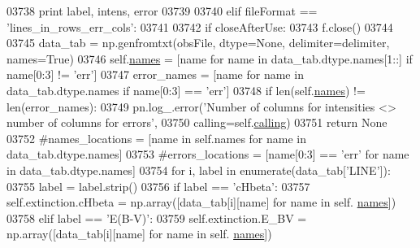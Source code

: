 \begin{DoxyCode}
03738                         \textcolor{keywordflow}{print} label, intens, error
03739                         
03740         \textcolor{keywordflow}{elif} fileFormat == \textcolor{stringliteral}{'lines\_in\_rows\_err\_cols'}:
03741             
03742             \textcolor{keywordflow}{if} closeAfterUse:
03743                 f.close()
03744                 
03745             data\_tab = np.genfromtxt(obsFile, dtype=\textcolor{keywordtype}{None}, delimiter=delimiter, names=\textcolor{keyword}{True})
03746             self.\hyperlink{classpyneb_1_1core_1_1pynebcore_1_1_observation_a3f365d0b1488b2eba300bf71caf23c17}{names} = [name \textcolor{keywordflow}{for} name \textcolor{keywordflow}{in} data\_tab.dtype.names[1::] \textcolor{keywordflow}{if} name[0:3] != \textcolor{stringliteral}{'err'}]
03747             error\_names = [name \textcolor{keywordflow}{for} name \textcolor{keywordflow}{in} data\_tab.dtype.names \textcolor{keywordflow}{if} name[0:3] == \textcolor{stringliteral}{'err'}]
03748             \textcolor{keywordflow}{if} len(self.\hyperlink{classpyneb_1_1core_1_1pynebcore_1_1_observation_a3f365d0b1488b2eba300bf71caf23c17}{names}) != len(error\_names):
03749                 pn.log\_.error(\textcolor{stringliteral}{'Number of columns for intensities <> number of columns for errors'},
03750                               calling=self.\hyperlink{classpyneb_1_1core_1_1pynebcore_1_1_observation_a2639fad9af4fefad20e4097295bd40e7}{calling})
03751                 \textcolor{keywordflow}{return} \textcolor{keywordtype}{None}
03752             \textcolor{comment}{#names\_locations = [name in self.names for name in data\_tab.dtype.names]}
03753             \textcolor{comment}{#errors\_locations = [name[0:3] == 'err' for name in data\_tab.dtype.names]}
03754             \textcolor{keywordflow}{for} i, label \textcolor{keywordflow}{in} enumerate(data\_tab[\textcolor{stringliteral}{'LINE'}]):
03755                 label = label.strip()
03756                 \textcolor{keywordflow}{if} label == \textcolor{stringliteral}{'cHbeta'}:
03757                     self.extinction.cHbeta = np.array([data\_tab[i][name] \textcolor{keywordflow}{for} name \textcolor{keywordflow}{in} self.
      \hyperlink{classpyneb_1_1core_1_1pynebcore_1_1_observation_a3f365d0b1488b2eba300bf71caf23c17}{names}])
03758                 \textcolor{keywordflow}{elif} label == \textcolor{stringliteral}{'E(B-V)'}:
03759                     self.extinction.E\_BV = np.array([data\_tab[i][name] \textcolor{keywordflow}{for} name \textcolor{keywordflow}{in} self.
      \hyperlink{classpyneb_1_1core_1_1pynebcore_1_1_observation_a3f365d0b1488b2eba300bf71caf23c17}{names}])

\end{DoxyCode}
